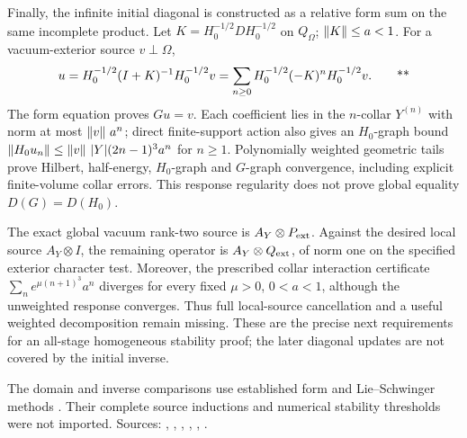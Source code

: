 Finally, the infinite initial diagonal is constructed as a relative form
sum on the same incomplete product. Let
\(K=H_0^{-1/2}DH_0^{-1/2}\) on \(Q_\Omega\);
\(\left\lVert K\right\rVert\le a<1\). For a vacuum-exterior source \(v\perp\Omega\),
\begin{equation}
 u=H_0^{-1/2}(I+K)^{-1}H_0^{-1/2}v
   =\sum_{n\ge0}H_0^{-1/2}(-K)^nH_0^{-1/2}v .
 \qquad\text{**}
 \label{eq:middle-neumann}
\end{equation}
The form equation proves \(Gu=v\).
Each coefficient lies in the \(n\)-collar \(Y^{(n)}\) with norm at most
\(\left\lVert v\right\rVert\,a^n\); direct finite-support action also gives an
\(H_0\)-graph bound
\(\left\lVert H_0u_n\right\rVert\le\left\lVert v\right\rVert\,|Y|(2n-1)^3a^n\) for \(n\ge1\).
Polynomially weighted geometric tails prove Hilbert, half-energy,
\(H_0\)-graph and \(G\)-graph convergence, including explicit
finite-volume collar errors. This response regularity does not prove
global equality \(D(G)=D(H_0)\).

The exact global vacuum rank-two source is \(A_Y\otimes P_{\rm ext}\).
Against the desired local source \(A_Y\otimes I\), the remaining operator
is \(A_Y\otimes Q_{\rm ext}\), of norm one on the specified exterior
character test. Moreover, the prescribed collar interaction certificate
\(\sum_n e^{\mu(n+1)^3}a^n\) diverges for every fixed \(\mu>0\),
\(0<a<1\), although the unweighted response converges.
Thus full local-source cancellation and a useful weighted decomposition
remain missing. These are the precise next requirements for an all-stage
homogeneous stability proof; the later diagonal updates are not covered
by the initial inverse.

The domain and inverse comparisons use established form and
Lie--Schwinger methods \cite{teschl2014methods,delvecchio2021unbounded}.
Their complete source inductions and numerical stability thresholds
were not imported. Sources:
,
,
,
,
,
.
